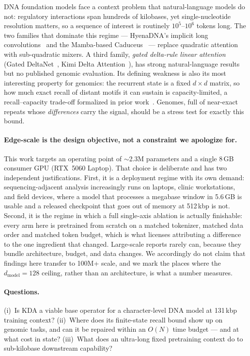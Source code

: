 \documentclass[11pt]{article}
\theoremstyle{plain}
\begin{document}
DNA foundation models face a context problem that natural-language models do not: regulatory
interactions span hundreds of kilobases, yet single-nucleotide resolution matters, so a sequence
of interest is routinely $10^5$--$10^6$ tokens long. The two families that dominate this regime
--- HyenaDNA's implicit long convolutions~\cite{nguyen2023hyenadna} and the Mamba-based
Caduceus~\cite{schiff2024caduceus} --- replace quadratic attention with sub-quadratic mixers. A
third family, \emph{gated delta-rule linear attention} (Gated DeltaNet~\cite{yang2025gated}, Kimi
Delta Attention~\cite{kimilinear2025}), has strong natural-language results but no published
genomic evaluation. Its defining weakness is also its most interesting property for genomics: the
recurrent state is a fixed $d\times d$ matrix, so how much exact recall of distant motifs it can sustain is
capacity-limited, a recall--capacity trade-off formalized in prior
work~\cite{arora2023zoology}. Genomes, full of near-exact repeats whose \emph{differences} carry
the signal, should be a stress test for exactly this bound.

\paragraph{Edge-scale is the design objective, not a constraint we apologize for.}
This work targets an operating point of $\sim$2.3M parameters and a single 8\,GB consumer GPU
(RTX~5060 Laptop). That choice is deliberate and has two independent justifications. First, it is
a deployment regime with its own demand: sequencing-adjacent analysis increasingly runs on
laptops, clinic workstations, and field devices, where a model that processes a megabase window
in 5.6\,GB is usable and a released checkpoint that goes out of memory at 512\,kbp is not.
Second, it is the regime in which a full single-axis ablation is actually finishable: every arm
here is pretrained from scratch on a matched tokenizer, matched data order and matched token
budget, which is what licenses attributing a difference to the one ingredient that changed.
Large-scale reports rarely can, because they bundle architecture, budget, and data changes.
We accordingly do not claim that findings here transfer to 100M+ scale, and we mark the places
where the $d_{\text{model}}{=}128$ ceiling, rather than an architecture, is what a number
measures.

\paragraph{Questions.} (i)~Is KDA a viable base operator for a character-level DNA model at
131\,kbp training context? (ii)~Where does its finite-state recall bound show up on genomic tasks,
and can it be repaired within an $O(N)$ time budget --- and at what cost in state? (iii)~What does
an ultra-long fixed pretraining context do to sub-kilobase downstream capability?
\end{document}
